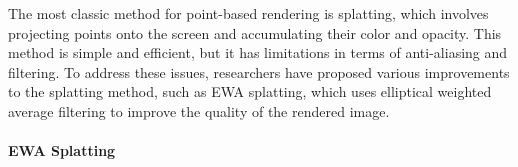

The most classic method for point-based rendering is splatting, which involves projecting points onto the screen and accumulating their color and opacity. This method is simple and efficient, but it has limitations in terms of anti-aliasing and filtering. To address these issues, researchers have proposed various improvements to the splatting method, such as EWA splatting, which uses elliptical weighted average filtering to improve the quality of the rendered image.

\paragraph{EWA Splatting}

